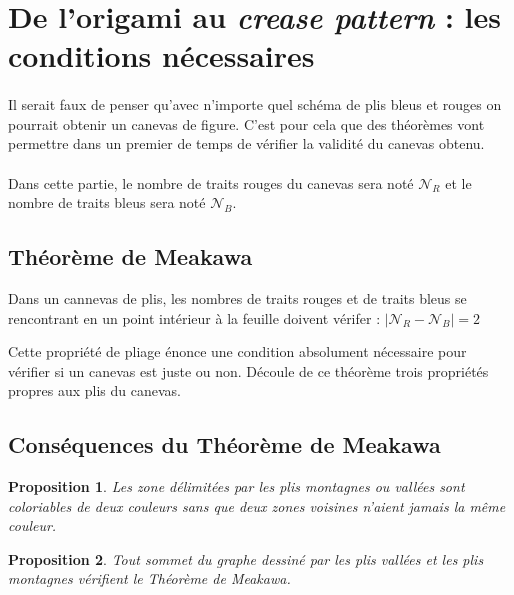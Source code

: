 \documentclass[a4paper,12pt,french]{report}
\newtheorem{proposition}{Proposition}[section]
\begin{document}
    
    

		\section{De l'origami au \emph{crease pattern} : les conditions 
		nécessaires}  

		\paragraph{} Il serait faux de penser qu’avec n’importe quel schéma de plis bleus et rouges on pourrait obtenir un canevas de figure. C’est pour cela que des théorèmes vont permettre dans un premier de temps de vérifier la validité du canevas obtenu.

		\paragraph{} Dans cette partie, le nombre de traits rouges du canevas sera noté \( \mathscr{N}_{R}\) et le nombre de traits bleus sera noté \(\mathscr{N}_{B}\).

		\subsection{Théorème de Meakawa}

		\begin{theorem}
			Dans un cannevas de plis, les nombres de traits rouges et  de traits bleus se rencontrant en un point intérieur à la feuille doivent vérifer : \(|\mathscr{N}_{R}-\mathscr{N}_{B}|=2\)
		\end{theorem}
      
      Cette propriété de pliage énonce une condition absolument nécessaire pour vérifier si un canevas est juste ou non.
      Découle de ce théorème trois propriétés propres aux plis du canevas.
      
		\subsection{Conséquences du Théorème de Meakawa}

		\begin{proposition}
			Les zone délimitées par les plis \emph{montagnes} ou \emph{vallées} sont coloriables de deux couleurs sans que deux zones voisines n’aient jamais la même couleur.
		\end{proposition} 
		\begin{proposition}
			Tout sommet du graphe dessiné par les plis \emph{vallées} et 
			les plis \emph{montagnes} vérifient le Théorème de Meakawa.
		\end{proposition}
\end{document}
